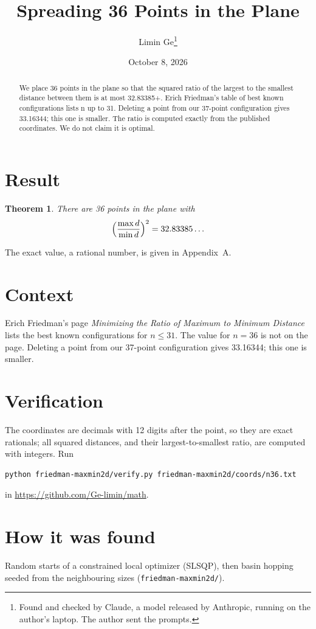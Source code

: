 \documentclass[11pt,a4paper]{article}
\title{Spreading 36 Points in the Plane}
\author{Limin Ge\thanks{Found and checked by Claude, a model released by Anthropic, running on the author's laptop. The author sent the prompts.}}
\date{October 8, 2026}
\newtheorem*{theorem}{Theorem}
\begin{document}
\maketitle
\begin{abstract}
We place 36 points in the plane so that the squared ratio of the largest to the smallest distance between them is at most 32.83385+. Erich Friedman's table of best known configurations lists n up to 31. Deleting a point from our 37-point configuration gives 33.16344; this one is smaller. The ratio is computed exactly from the published coordinates. We do not claim it is optimal.
\end{abstract}

\section{Result}
\begin{theorem}
There are 36 points in the plane with
\[ \Bigl(\frac{\max d}{\min d}\Bigr)^2 = 32.83385\ldots \]
\end{theorem}
The exact value, a rational number, is given in Appendix~A.


\section{Context}
Erich Friedman's page \emph{Minimizing the Ratio of Maximum to Minimum Distance} lists the best known configurations for $n\le 31$. The value for $n=36$ is not on the page. Deleting a point from our 37-point configuration gives 33.16344; this one is smaller.


\section{Verification}
The coordinates are decimals with 12 digits after the point, so they are exact rationals; all squared distances, and their largest-to-smallest ratio, are computed with integers. Run
\begin{verbatim}
python friedman-maxmin2d/verify.py friedman-maxmin2d/coords/n36.txt
\end{verbatim}
in \url{https://github.com/Ge-limin/math}.


\section{How it was found}
Random starts of a constrained local optimizer (SLSQP), then basin hopping seeded from the neighbouring sizes (\texttt{friedman-maxmin2d/}).
\end{document}
